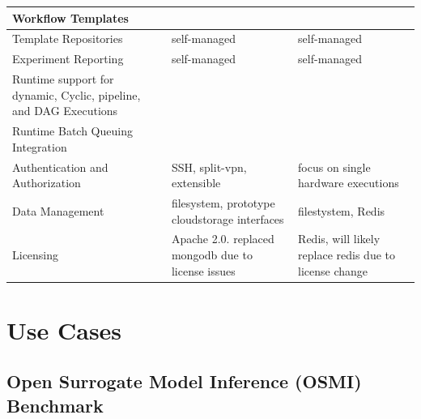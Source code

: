 \documentclass[sigconf]{acmart}
\newcommand{\YES}{\ding{51}}
\begin{document}
\begin{table}[htbp]
{\begin{tabular}{|p{6cm}|l|l|}
Workflow Templates &  \YES   &  \YES  \\ \hline
Template Repositories & self-managed    &  self-managed  \\ \hline
Experiment Reporting &  self-managed   & self-managed   \\ \hline
Runtime support for dynamic, Cyclic, pipeline, and DAG Executions &     \YES & \YES \\ \hline
Runtime Batch Queuing Integration &  \YES   & \YES   \\ \hline
Authentication and Authorization &  SSH, split-vpn, extensible   & focus on single hardware executions  \\ \hline
Data Management & filesystem, prototype cloudstorage interfaces   & filestystem, Redis   \\ \hline
Licensing & Apache 2.0. replaced mongodb due to license 
issues    & Redis, will likely replace redis due to license change \\ \hline
\end{tabular}
}
\end{table}



\section{Use Cases}
\label{sec:use_cases}


\subsection{Open Surrogate Model Inference (OSMI) Benchmark}
\end{document}
